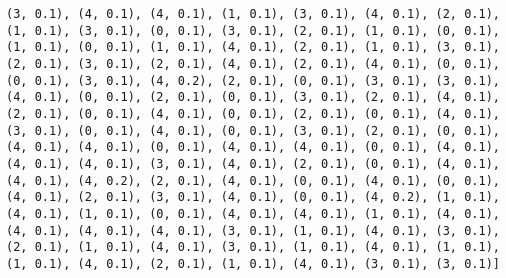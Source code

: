 \documentclass[11pt]{article}
\begin{document}
\begin{Verbatim}[commandchars=\\\{\}]
(3, 0.1), (4, 0.1), (4, 0.1), (1, 0.1), (3, 0.1), (4, 0.1), (2, 0.1), (1, 0.1), (3, 0.1), (0, 0.1), (3, 0.1), (2, 0.1), (1, 0.1), (0, 0.1), (1, 0.1), (0, 0.1), (1, 0.1), (4, 0.1), (2, 0.1), (1, 0.1), (3, 0.1), (2, 0.1), (3, 0.1), (2, 0.1), (4, 0.1), (2, 0.1), (4, 0.1), (0, 0.1), (0, 0.1), (3, 0.1), (4, 0.2), (2, 0.1), (0, 0.1), (3, 0.1), (3, 0.1), (4, 0.1), (0, 0.1), (2, 0.1), (0, 0.1), (3, 0.1), (2, 0.1), (4, 0.1), (2, 0.1), (0, 0.1), (4, 0.1), (0, 0.1), (2, 0.1), (0, 0.1), (4, 0.1), (3, 0.1), (0, 0.1), (4, 0.1), (0, 0.1), (3, 0.1), (2, 0.1), (0, 0.1), (4, 0.1), (4, 0.1), (0, 0.1), (4, 0.1), (4, 0.1), (0, 0.1), (4, 0.1), (4, 0.1), (4, 0.1), (3, 0.1), (4, 0.1), (2, 0.1), (0, 0.1), (4, 0.1), (4, 0.1), (4, 0.2), (2, 0.1), (4, 0.1), (0, 0.1), (4, 0.1), (0, 0.1), (4, 0.1), (2, 0.1), (3, 0.1), (4, 0.1), (0, 0.1), (4, 0.2), (1, 0.1), (4, 0.1), (1, 0.1), (0, 0.1), (4, 0.1), (4, 0.1), (1, 0.1), (4, 0.1), (4, 0.1), (4, 0.1), (4, 0.1), (3, 0.1), (1, 0.1), (4, 0.1), (3, 0.1), (2, 0.1), (1, 0.1), (4, 0.1), (3, 0.1), (1, 0.1), (4, 0.1), (1, 0.1), (1, 0.1), (4, 0.1), (2, 0.1), (1, 0.1), (4, 0.1), (3, 0.1), (3, 0.1)]

\end{Verbatim}
\end{document}

